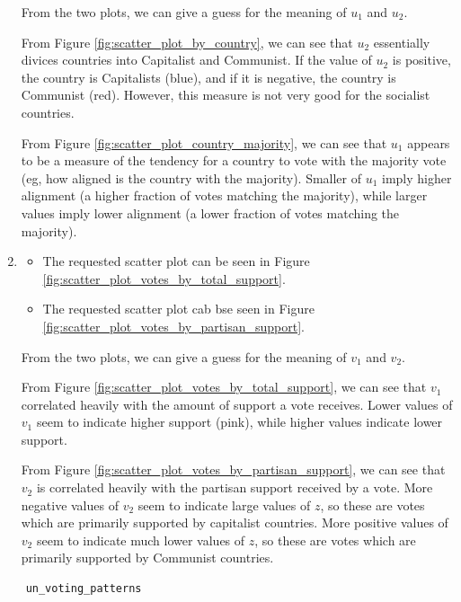 \documentclass[12pt]{exam}
\begin{document}
\begin{questions}
\begin{solution}
\begin{enumerate}[label=(\alph*)]
        From the two plots, we can give a guess for the meaning of $u_1$ and $u_2$.

        From Figure \ref{fig:scatter_plot_by_country}, we can see that $u_2$ essentially divices countries into Capitalist and Communist. If the value of $u_2$ is positive, the country is Capitalists (blue), and if it is negative, the country is Communist (red). However, this measure is not very good for the socialist countries.

        From Figure \ref{fig:scatter_plot_country_majority}, we can see that $u_1$ appears to be a measure of the tendency for a country to vote with the majority vote (eg, how aligned is the country with the majority). Smaller of $u_1$ imply higher alignment (a higher fraction of votes matching the majority), while larger values imply lower alignment (a lower fraction of votes matching the majority).

      \item
        \begin{itemize}
          \item The requested scatter plot can be seen in Figure \ref{fig:scatter_plot_votes_by_total_support}.
          \item The requested scatter plot cab bse seen in Figure \ref{fig:scatter_plot_votes_by_partisan_support}.
        \end{itemize}

        From the two plots, we can give a guess for the meaning of $v_1$ and $v_2$.

        From Figure \ref{fig:scatter_plot_votes_by_total_support}, we can see that $v_1$ correlated heavily with the amount of support a vote receives. Lower values of $v_1$ seem to indicate higher support (pink), while higher values indicate lower support.

        From Figure \ref{fig:scatter_plot_votes_by_partisan_support}, we can see that $v_2$ is correlated heavily with the partisan support received by a vote. More negative values of $v_2$ seem to indicate large values of $z$, so these are votes which are primarily supported by capitalist countries. More positive values of $v_2$ seem to indicate much lower values of $z$, so these are votes which are primarily supported by Communist countries.
    \end{enumerate}
  \end{solution}

  \begin{verbatim}
    un_voting_patterns


\end{verbatim}
\end{questions}
\end{document}
